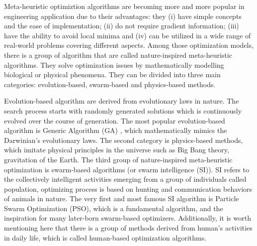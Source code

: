 \documentclass[../main.tex]{subfiles}
\begin{document}
	Meta-heuristic optimiztion algorithms are becoming more and more popular in engineering application due to their advantages: they (i) have simple concepts and the ease of implementation; (ii) do not require gradient information; (iii) have the ability to avoid local minima and (iv) can be utilized in a wide range of real-world problems covering different aspects. Among those optimization models, there is a group of algorithm that are called nature-inspired meta-heuristic algorithms. They solve optimization issues by mathematically modelling biological or physical phenomena. They can be divided into three main categories: evolution-based, swarm-based and physics-based methods. 
	
	Evolution-based algorithm are derived from evolutionary laws in nature. The search process starts with randomly generated solutions which is continuously evolved over the course of generation. The most popular evolution-based algorithm is Generic Algorithm (GA) \cite{holland1992genetic}, which mathematically mimics the Darwinian's evolutionary laws. The second category is physics-based methods, which imitate physical principles in the universe such as Big Bang theory, gravitation of the Earth.  The third group of nature-inspired meta-heuristic optimization is swarm-based algorithms (or swarm intelligence (SI)). SI refers to the collectively intelligent activities emerging from a group of individuals called population, optimizing process is based on hunting and communication behaviors of animals in nature. The very first and most famous SI algorithm is Particle Swarm Optimization (PSO), which is a fundamental algorithm, and the inspiration for many later-born swarm-based optimizers. Additionally, it is worth mentioning here that there is a group of methods derived from human's activities in daily life, which is called human-based optimization algorithms. 
	
\end{document}
